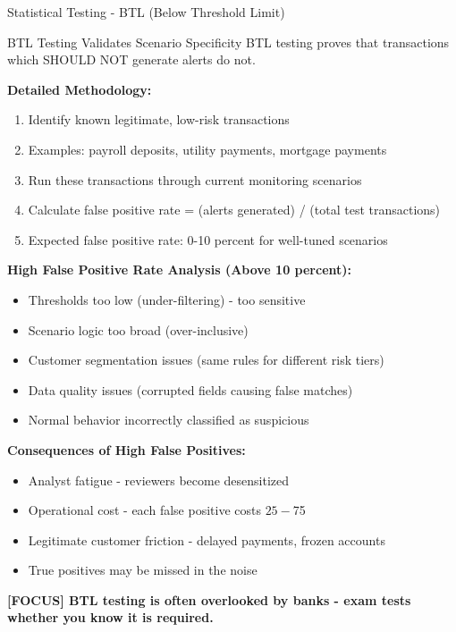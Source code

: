 \documentclass[11pt,a4paper]{beamer}
\newcommand{\examfocus}[1]{\textcolor{orange!80!black}{\textbf{[FOCUS] #1}}}
\begin{document}
	\begin{frame}{Statistical Testing - BTL (Below Threshold Limit)}
		\begin{block}{BTL Testing Validates Scenario Specificity}
			BTL testing proves that transactions which SHOULD NOT generate alerts do not.
		\end{block}
		
		\textbf{Detailed Methodology:}
		\begin{enumerate}
			\item Identify known legitimate, low-risk transactions
			\item Examples: payroll deposits, utility payments, mortgage payments
			\item Run these transactions through current monitoring scenarios
			\item Calculate false positive rate = (alerts generated) / (total test transactions)
			\item Expected false positive rate: 0-10 percent for well-tuned scenarios
		\end{enumerate}
		
		\textbf{High False Positive Rate Analysis (Above 10 percent):}
		\begin{itemize}
			\item Thresholds too low (under-filtering) - too sensitive
			\item Scenario logic too broad (over-inclusive)
			\item Customer segmentation issues (same rules for different risk tiers)
			\item Data quality issues (corrupted fields causing false matches)
			\item Normal behavior incorrectly classified as suspicious
		\end{itemize}
		
		\textbf{Consequences of High False Positives:}
		\begin{itemize}
			\item Analyst fatigue - reviewers become desensitized
			\item Operational cost - each false positive costs $25-$75
			\item Legitimate customer friction - delayed payments, frozen accounts
			\item True positives may be missed in the noise
		\end{itemize}
		
		\examfocus{BTL testing is often overlooked by banks - exam tests whether you know it is required.}
	\end{frame}
	
\end{document}
